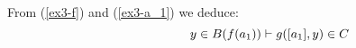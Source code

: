 \noindent
				From (\ref{ex3-f}) and (\ref{ex3-a_1}) we deduce: \begin{equation}
				\hspace{2cm}y \in B(f(a_1)) \vdash g([a_1], y) \in C\label{ex3-expr1}
				\end{equation}
			